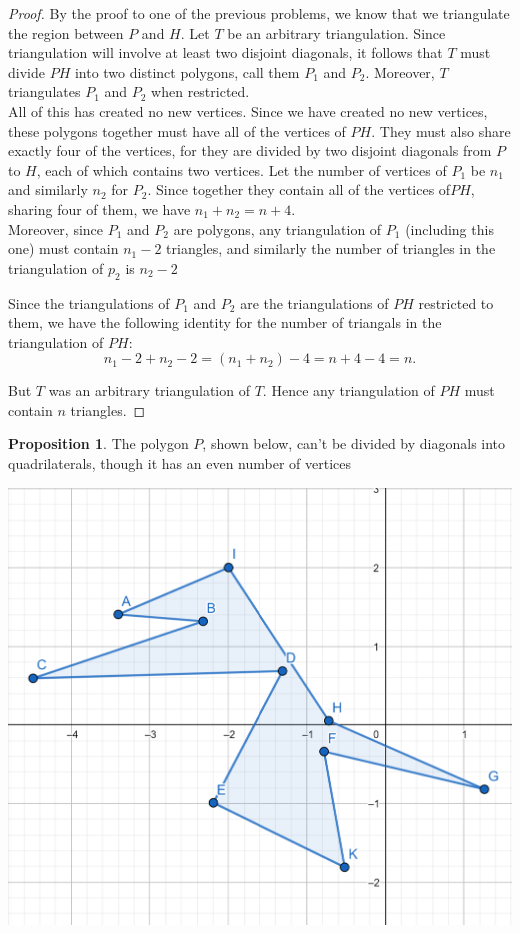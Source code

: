 \documentclass[12pt]{article}
\theoremstyle{definition}
\newtheorem{proposition}{Proposition}
\begin{document}
\begin{proof}
By the proof to one of the previous problems, we know that we triangulate the region between $P$ and $H$. Let $T$ be an arbitrary triangulation. Since triangulation will involve at least two disjoint diagonals, it follows that $T$ must divide $PH$ into two distinct polygons, call them $P_1$ and $P_2$. Moreover, $T$ triangulates $P_1$ and $P_2 $ when restricted.\\

 All of this has created no new vertices. Since we have created no new vertices, these polygons together must have all of the vertices of $PH$. They must also share exactly four of the vertices, for they are divided by two disjoint diagonals from $P$ to $H$, each of which contains two vertices. Let the number of vertices of $P_1$ be $n_1$ and similarly $n_2$ for $P_2$. Since together they contain all of the vertices of$PH$, sharing four of them, we have $n_1 + n_2 = n + 4$.\\
 
 Moreover, since $P_1$ and $P_2 $ are polygons, any triangulation of $P_1$ (including this one) must contain $n_1 - 2$ triangles, and similarly the number of triangles in the triangulation of $p_2$ is $n_2 - 2$
 
 Since the triangulations of $P_1$ and $P_2$ are the triangulations of $PH$ restricted to them, we have the following identity for the number of triangals in the triangulation of $PH$:
\[n_1 - 2 + n_2 -2 = (n_1 + n_2) - 4 = n + 4 -4 = n.\]

But $T$ was an arbitrary triangulation of $T$. Hence any triangulation of $PH$ must contain $n$ triangles.



\end{proof}


\newpage

\begin{proposition}
The polygon $P$, shown below, can't be divided by diagonals into quadrilaterals, though it has an even number of vertices

\includegraphics[scale=0.5]{cant_be_quaded.png}
\end{proposition}
\end{document}
